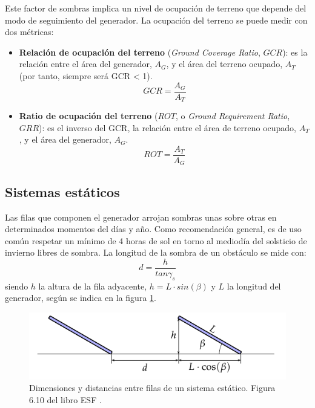 Este factor de sombras implica un nivel de ocupación de terreno que depende del modo de seguimiento del generador. La ocupación del terreno se puede medir con dos métricas:
\begin{itemize}
\item \textbf{Relación de ocupación del terreno} (\emph{Ground Coverage Ratio}, \(GCR\)): es la relación entre el área del generador, \(A_G\), y el área del terreno ocupado, \(A_T\) (por tanto, siempre será GCR < 1).  
\begin{equation}
GCR = \frac{A_G}{A_T}
\end{equation}
\item \textbf{Ratio de ocupación del terreno} (\(ROT\), o \emph{Ground Requirement Ratio}, \(GRR\)): es el inverso del GCR, la relación entre el área de terreno ocupado, \(A_T\), y el área del generador, \(A_G\). 
\begin{equation}
ROT = \frac{A_T}{A_G}
\end{equation}
\end{itemize}

\subsection{Sistemas estáticos}
\label{sec:org7d6b115}
Las filas que componen el generador arrojan sombras unas sobre otras en determinados momentos del días y año. Como recomendación general, es de uso común respetar un mínimo de 4 horas de sol en torno al mediodía del solsticio de invierno libres de sombra. La longitud de la sombra de un obstáculo se mide con:
\begin{equation}
d = \frac{h}{tan\gamma_s}
\end{equation}
siendo \(h\) la altura de la fila adyacente, \(h=L\cdot sin(\beta)\) y \(L\) la longitud del generador, según se indica en la figura \ref{fig:sombras-estaticos}.
\begin{figure}[htbp]
\centering
\includegraphics[width=.9\linewidth]{figuras/SombrasEstaticas.pdf}
\caption{Dimensiones y distancias entre filas de un sistema estático. Figura 6.10 del libro ESF \cite{Perpinan2023}. \label{fig:sombras-estaticos}}
\end{figure}

